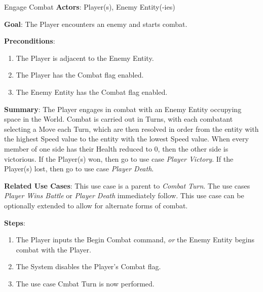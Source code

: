 \begin{subsection}{Engage Combat}
\textbf{Actors}:
Player(s), Enemy Entity(-ies)

\textbf{Goal}:
The Player encounters an enemy and starts combat.

\textbf{Preconditions}:
\begin{enumerate}
\item The Player is adjacent to the Enemy Entity.
\item The Player has the Combat flag enabled.
\item The Enemy Entity has the Combat flag enabled.
\end{enumerate}

\textbf{Summary}:
The Player engages in combat with an Enemy Entity occupying space in the
World. Combat is carried out in Turns, with each combatant selecting a Move
each Turn, which are then resolved in order from the entity with the
highest Speed value to the entity with the lowest Speed value. When every
member of one side has their Health reduced to 0, then the other side is
victorious. If the Player(s) won, then go to use case \textit{Player
Victory}. If the Player(s) lost, then go to use case \textit{Player Death}.

\textbf{Related Use Cases}:
This use case is a parent to \textit{Combat Turn}. The use cases
\textit{Player Wins Battle} or \textit{Player Death} immediately follow. This
use case can be optionally extended to allow for alternate forms of combat.

\textbf{Steps}:
\begin{enumerate}
\item The Player inputs the Begin Combat command, \textit{or} the Enemy
Entity begins combat with the Player.
\item The System disables the Player's Combat flag.
\item The use case Cmbat Turn is now performed.
\end{enumerate}
\end{subsection}



